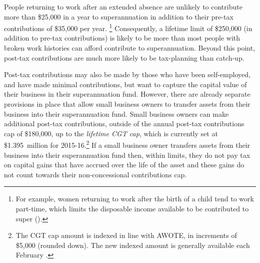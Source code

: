 People returning to work after an extended absence are unlikely to contribute more than \$25,000 in a year to superannuation in addition to their pre-tax contributions of \$35,000 per year.%
\footnote{For example, women returning to work after the birth of a child tend to work part-time, which limits the disposable income available to be contributed to super (\textcite[][222]{ProductivityCommission2009PaidParentalLeave}).} %
Consequently, a lifetime limit of \$250,000 (in addition to pre-tax contributions) is likely to be more than most people with broken work histories can afford contribute to superannuation. Beyond this point, post-tax contributions are much more likely to be tax-planning than catch-up. 

Post-tax contributions may also be made by those who have been self-employed, and have made minimal contributions, but want to capture the capital value of their business in their superannuation fund. However, there are already separate provisions in place that allow small business owners to transfer assets from their business into their superannuation fund. Small business owners can make additional post-tax contributions, outside of the annual post-tax contributions cap of \$180,000, up to the \emph{lifetime CGT cap}\label{paragraph:SUPER-lifetime-CGT-cap}, which is currently set at \$1.395~million for 2015-16.\footnote{The CGT cap amount is indexed in line with AWOTE, in increments of \$5,000 (rounded down). The new indexed amount is generally available each February \textcite{ATO2015CGT-cap-amount}.}  If a small business owner transfers assets from their business into their superannuation fund then, within limits, they do not pay tax on capital gains that have accrued over the life of the asset and these gains do not count towards their non-concessional contributions cap.%
\label{fn:172}

